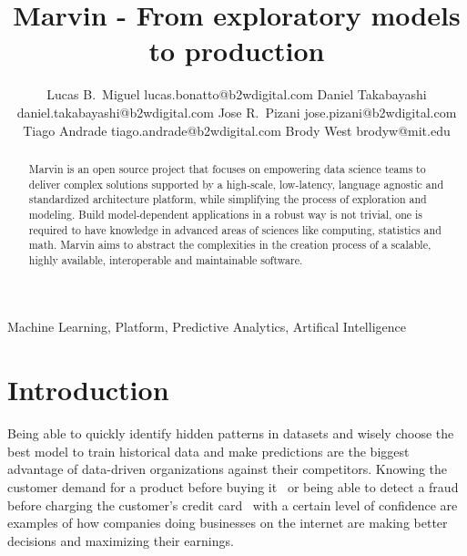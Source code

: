 \documentclass[twoside,11pt]{article}
\begin{document}
\title{Marvin - From exploratory models to production}

\author{\name Lucas B.\ Miguel \email lucas.bonatto@b2wdigital.com
       \AND
        \name Daniel Takabayashi \email daniel.takabayashi@b2wdigital.com
       \AND
       \name Jose R.\ Pizani \email jose.pizani@b2wdigital.com
       \AND
       \name Tiago Andrade \email tiago.andrade@b2wdigital.com
       \AND
       \name Brody West \email brodyw@mit.edu \\
       }


\maketitle

\begin{abstract}%
Marvin is an open source project that focuses on empowering data science teams to deliver complex solutions supported by a high-scale, low-latency, language agnostic and standardized architecture platform, while simplifying the process of exploration and modeling. Build model-dependent applications in a robust way is not trivial, one is required to have knowledge in advanced areas of sciences like computing, statistics and math. Marvin aims to abstract the complexities in the creation process of a scalable, highly available, interoperable and maintainable software.
\end{abstract}

\begin{keywords}
  Machine Learning, Platform, Predictive Analytics, Artifical Intelligence
\end{keywords}

\section{Introduction}

Being able to quickly identify hidden patterns in datasets and wisely choose the best model to train historical data and make predictions are the biggest advantage of data-driven organizations against their competitors. Knowing the customer demand for a product before buying it~\citep{chen2000quantifying} or being able to detect a fraud before charging the customer's credit card~\citep{chan1998toward} with a certain level of confidence are examples of how companies doing businesses on the internet are making better decisions and maximizing their earnings.
\end{document}
